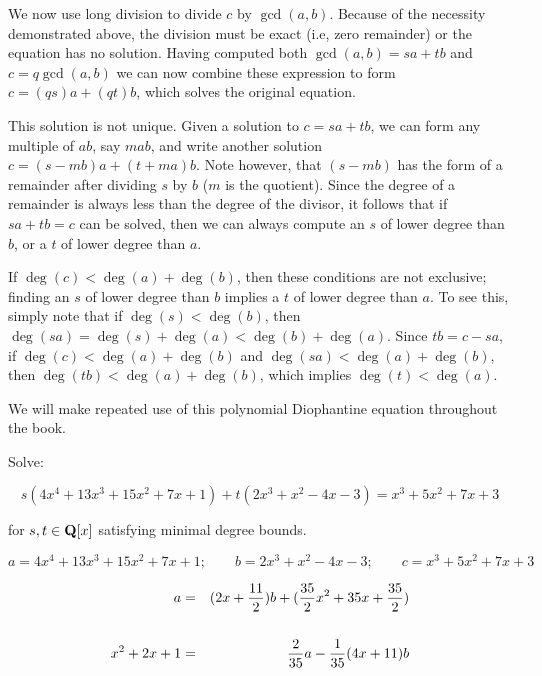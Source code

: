 We now use long division to divide $c$ by $\gcd(a,b)$.  Because of the
necessity demonstrated above, the division must be exact (i.e, zero
remainder) or the equation has no solution.  Having computed both
$\gcd(a,b)=sa+tb$ and $c=q\gcd(a,b)$ we can now combine these
expression to form $c=(qs)a+(qt)b$, which solves the original
equation.

This solution is not unique.  Given a solution to $c=sa+tb$, we can
form any multiple of $ab$, say $mab$, and write another solution
$c=(s-mb)a+(t+ma)b$.  Note however, that $(s-mb)$ has the form of a
remainder after dividing $s$ by $b$ ($m$ is the quotient).  Since the
degree of a remainder is always less than the degree of the divisor,
it follows that if $sa+tb=c$ can be solved, then we can always compute
an $s$ of lower degree than $b$, or a $t$ of lower degree than $a$.

If $\deg(c)<\deg(a)+\deg(b)$, then these conditions are not exclusive;
finding an $s$ of lower degree than $b$ implies a $t$ of lower degree
than $a$.  To see this, simply note that if $\deg(s)<\deg(b)$, then
$\deg(sa)=\deg(s)+\deg(a)<\deg(b)+\deg(a)$.  Since $tb=c-sa$, if
$\deg(c)<\deg(a)+\deg(b)$ and $\deg(sa)<\deg(a)+\deg(b)$, then
$\deg(tb)<\deg(a)+\deg(b)$, which implies $\deg(t)<\deg(a)$.

We will make repeated use of this polynomial Diophantine equation
throughout the book.

\vfill\eject

\example

Solve:

$$s(4x^4+13x^3+15x^2+7x+1) + t(2x^3+x^2-4x-3) = x^3 + 5x^2 + 7x +3$$

\quad for $s,t \in {\bf Q}[x]$ satisfying minimal degree bounds.

\bigskip




$$a = 4x^4+13x^3+15x^2+7x+1; \qquad
b = 2x^3+x^2-4x-3; \qquad
c = x^3 + 5x^2 + 7x +3$$


\begin{eqnarray*}
a &=& (2x+{11\over2})b + ({35\over2}x^2+35x+{35\over2})
 \cr\cr
x^2+2x+1 &=& {2\over35}a - {1\over35}(4x+11)b \cr
\end{eqnarray*}

